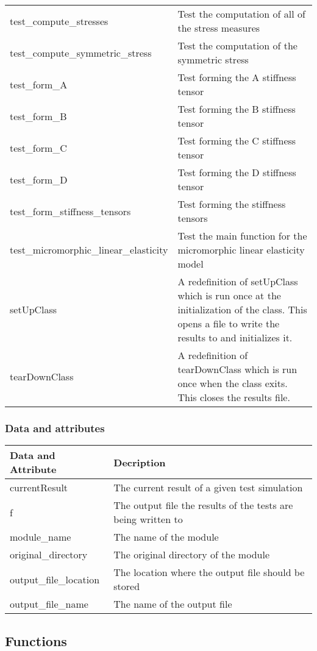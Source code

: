 \documentclass{asme2ej}
\begin{document}
\begin{longtable}{ p{}  p{} }
test\_compute\_stresses & Test the computation of all of the stress measures\\
test\_compute\_symmetric\_stress &  Test the computation of the symmetric stress\\
test\_form\_A & Test forming the A stiffness tensor\\
test\_form\_B & Test forming the B stiffness tensor\\
test\_form\_C & Test forming the C stiffness tensor\\
test\_form\_D & Test forming the D stiffness tensor\\
test\_form\_stiffness\_tensors & Test forming the stiffness tensors\\
test\_micromorphic\_linear\_elasticity & Test the main function for the micromorphic linear elasticity model\\
setUpClass & A redefinition of setUpClass which is run once at the initialization of the class. This opens a file to write the results to and initializes it.\\
tearDownClass & A redefinition of tearDownClass which is run once when the class exits. This closes the results file.\\
\hline
\end{longtable}

\subsubsection{Data and attributes}
\begin{longtable}{ p{}  p{} }
\hline
Data and Attribute & Decription\\
\hline
\hline
currentResult & The current result of a given test simulation\\
f & The output file the results of the tests are being written to\\
module\_name & The name of the module\\
original\_directory & The original directory of the module\\
output\_file\_location & The location where the output file should be stored\\
output\_file\_name & The name of the output file\\
\hline
\end{longtable}

\subsection{Functions}
\end{document}
